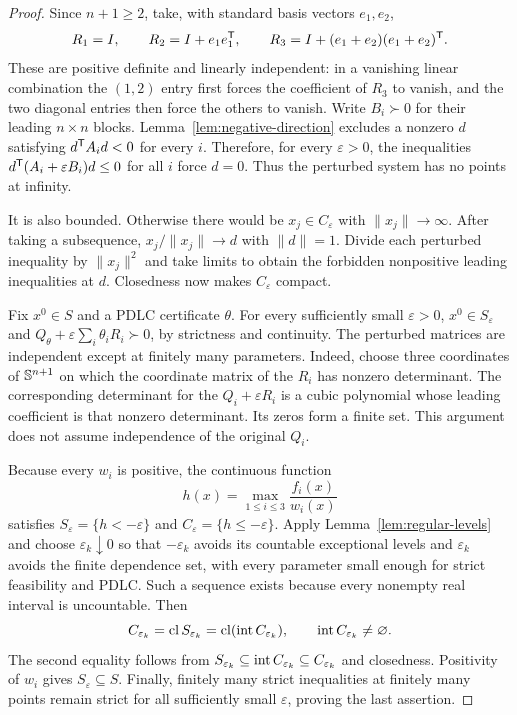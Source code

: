\begin{proof}
Since $n+1\geq2$, take, with standard basis vectors $e_1,e_2$,
\[
 R_1=I,\qquad R_2=I+e_1e_1^{\mathsf T},\qquad
 R_3=I+(e_1+e_2)(e_1+e_2)^{\mathsf T}.
\]
These are positive definite and linearly independent: in a vanishing
linear combination the $(1,2)$ entry first forces the coefficient of
$R_3$ to vanish, and the two diagonal entries then force the others to
vanish. Write $B_i\succ0$ for their leading $n\times n$ blocks.
Lemma~\ref{lem:negative-direction} excludes a nonzero $d$ satisfying
$d^{\mathsf T} A_i d<0$ for every $i$. Therefore, for every
$\varepsilon>0$, the inequalities
$d^{\mathsf T}(A_i+\varepsilon B_i)d\leq0$ for all $i$ force $d=0$.
Thus the perturbed system has no points at infinity.

It is also bounded. Otherwise there would be $x_j\in C_\varepsilon$
with $\|x_j\|\to\infty$. After taking a subsequence,
$x_j/\|x_j\|\to d$ with $\|d\|=1$. Divide each perturbed
inequality by $\|x_j\|^2$ and take limits to obtain the forbidden
nonpositive leading inequalities at $d$. Closedness now makes
$C_\varepsilon$ compact.

Fix $x^0\in S$ and a PDLC certificate $\theta$. For every sufficiently
small $\varepsilon>0$, $x^0\in S_\varepsilon$ and
$Q_\theta+\varepsilon\sum_i\theta_iR_i\succ0$, by strictness and
continuity. The perturbed matrices are independent except at finitely
many parameters. Indeed, choose three coordinates of $\mathbb S^{n+1}$
on which the coordinate matrix of the $R_i$ has nonzero determinant.
The corresponding determinant for the $Q_i+\varepsilon R_i$ is a
cubic polynomial whose leading coefficient is that nonzero determinant.
Its zeros form a finite set. This argument does not assume independence
of the original $Q_i$.

Because every $w_i$ is positive, the continuous function
\[
 h(x)=\max_{1\leq i\leq3}\frac{f_i(x)}{w_i(x)}
\]
satisfies $S_\varepsilon=\{h<-\varepsilon\}$ and
$C_\varepsilon=\{h\leq-\varepsilon\}$. Apply
Lemma~\ref{lem:regular-levels} and choose $\varepsilon_k\downarrow0$
so that $-\varepsilon_k$ avoids its countable exceptional levels and
$\varepsilon_k$ avoids the finite dependence set, with every parameter
small enough for strict feasibility and PDLC. Such a sequence exists
because every nonempty real interval is uncountable. Then
\[
 C_{\varepsilon_k}=\operatorname{cl} S_{\varepsilon_k}
   =\operatorname{cl}(\operatorname{int} C_{\varepsilon_k}),\qquad
 \operatorname{int} C_{\varepsilon_k}\ne\varnothing.
\]
The second equality follows from
$S_{\varepsilon_k}\subseteq\operatorname{int} C_{\varepsilon_k}
\subseteq C_{\varepsilon_k}$ and closedness. Positivity of $w_i$
gives $S_\varepsilon\subseteq S$. Finally, finitely many strict
inequalities at finitely many points remain strict for all sufficiently
small $\varepsilon$, proving the last assertion.
\end{proof}

